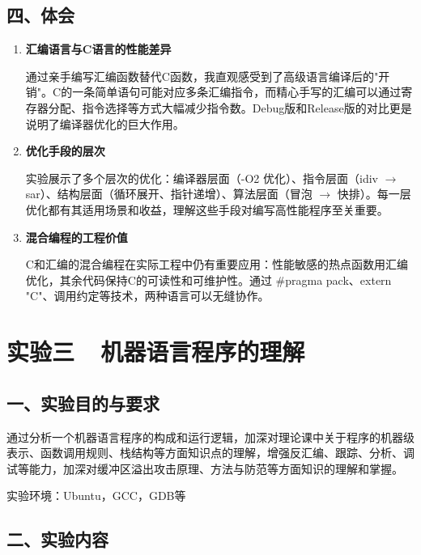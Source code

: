\subsection*{四、体会}

\begin{enumerate}[label=\arabic*.]
    \item \textbf{汇编语言与C语言的性能差异}

    通过亲手编写汇编函数替代C函数，我直观感受到了高级语言编译后的"开销"。C的一条简单语句可能对应多条汇编指令，而精心手写的汇编可以通过寄存器分配、指令选择等方式大幅减少指令数。Debug版和Release版的对比更是说明了编译器优化的巨大作用。

    \item \textbf{优化手段的层次}

    实验展示了多个层次的优化：编译器层面（-O2 优化）、指令层面（idiv $\to$ sar）、结构层面（循环展开、指针递增）、算法层面（冒泡 $\to$ 快排）。每一层优化都有其适用场景和收益，理解这些手段对编写高性能程序至关重要。

    \item \textbf{混合编程的工程价值}

    C和汇编的混合编程在实际工程中仍有重要应用：性能敏感的热点函数用汇编优化，其余代码保持C的可读性和可维护性。通过 \#pragma pack、extern "C"、调用约定等技术，两种语言可以无缝协作。
\end{enumerate}

\newpage

\section*{实验三\ \ 机器语言程序的理解}

\subsection*{一、实验目的与要求}

通过分析一个机器语言程序的构成和运行逻辑，加深对理论课中关于程序的机器级表示、函数调用规则、栈结构等方面知识点的理解，增强反汇编、跟踪、分析、调试等能力，加深对缓冲区溢出攻击原理、方法与防范等方面知识的理解和掌握。

实验环境：Ubuntu，GCC，GDB等

\subsection*{二、实验内容}

